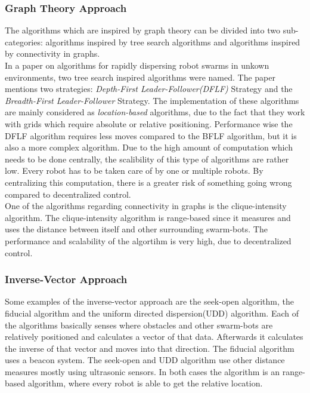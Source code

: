 \subsubsection{Graph Theory Approach}
The algorithms which are inspired by graph theory can be divided into two sub-categories: algorithms inspired by tree search algorithms and algorithms inspired by connectivity in graphs.\\

In a paper on algorithms for rapidly dispersing robot swarms in unkown environments\cite{hsiang2004algorithms}, two tree search inspired algorithms were named.
The paper mentions two strategies: \emph{Depth-First Leader-Follower(DFLF)} Strategy and the \emph{Breadth-First Leader-Follower} Strategy.
The implementation of these algorithms are mainly considered as \emph{location-based} algorithms, due to the fact that they work with grids which require absolute or relative positioning.
Performance wise the DFLF algorithm requires less moves compared to the BFLF algorithm, but it is also a more complex algorithm.
Due to the high amount of computation which needs to be done centrally, the scalibility of this type of algorithms are rather low.
Every robot has to be taken care of by one or multiple robots. By centralizing this computation, there is a greater risk of something going wrong compared to decentralized control.\\

One of the algorithms regarding connectivity in graphs is the clique-intensity algorithm.\cite{ugur2007dispersion}
The clique-intensity algorithm is range-based since it measures and uses the distance between itself and other surrounding swarm-bots.
The performance and scalability of the algortihm is very high, due to decentralized control.

\subsubsection{Inverse-Vector Approach}
Some examples of the inverse-vector approach are the seek-open algorithm\cite{morlok2007dispersing}, the fiducial algorithm\cite{morlok2007dispersing} and the uniform directed dispersion(UDD) algorithm\cite{mclurkin2007distributed}.
Each of the algorithms basically senses where obstacles and other swarm-bots are relatively positioned and calculates a vector of that data. Afterwards it calculates the inverse of that vector and moves into that direction.
The fiducial algorithm uses a beacon system. The seek-open and UDD algorithm use other distance measures mostly using ultrasonic sensors. In both cases the algorithm is an range-based algorithm, where every robot is able to get the relative location. 

